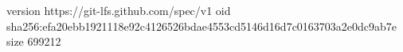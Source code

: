 version https://git-lfs.github.com/spec/v1
oid sha256:efa20ebb1921118e92c4126526bdae4553cd5146d16d7c0163703a2e0dc9ab7e
size 699212

